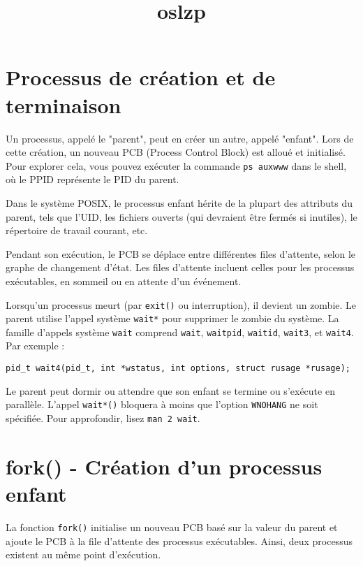 \documentclass[12pt]{article}
\title{oslzp}
\author{}
\date{}
\begin{document}
\maketitle
\tableofcontents
\newpage

\section{Processus de création et de terminaison}

Un processus, appelé le "parent", peut en créer un autre, appelé "enfant". Lors de cette création, un nouveau PCB (Process Control Block) est alloué et initialisé. Pour explorer cela, vous pouvez exécuter la commande \texttt{ps auxwww} dans le shell, où le PPID représente le PID du parent.

Dans le système POSIX, le processus enfant hérite de la plupart des attributs du parent, tels que l'UID, les fichiers ouverts (qui devraient être fermés si inutiles), le répertoire de travail courant, etc.

Pendant son exécution, le PCB se déplace entre différentes files d'attente, selon le graphe de changement d'état. Les files d'attente incluent celles pour les processus exécutables, en sommeil ou en attente d'un événement.

Lorsqu'un processus meurt (par \texttt{exit()} ou interruption), il devient un zombie. Le parent utilise l'appel système \texttt{wait*} pour supprimer le zombie du système. La famille d'appels système \texttt{wait} comprend \texttt{wait}, \texttt{waitpid}, \texttt{waitid}, \texttt{wait3}, et \texttt{wait4}. Par exemple :

\begin{lstlisting}
pid_t wait4(pid_t, int *wstatus, int options, struct rusage *rusage);
\end{lstlisting}

Le parent peut dormir ou attendre que son enfant se termine ou s'exécute en parallèle. L'appel \texttt{wait*()} bloquera à moins que l'option \texttt{WNOHANG} ne soit spécifiée. Pour approfondir, lisez \texttt{man 2 wait}.

\section{fork() - Création d'un processus enfant}

La fonction \texttt{fork()} initialise un nouveau PCB basé sur la valeur du parent et ajoute le PCB à la file d'attente des processus exécutables. Ainsi, deux processus existent au même point d'exécution.
\end{document}
